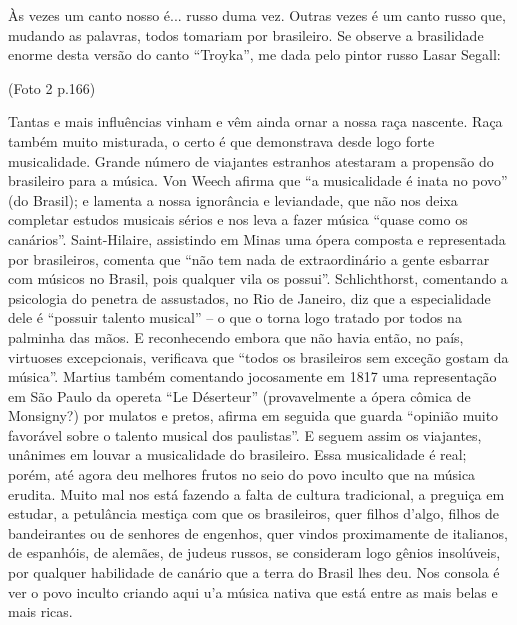 Às vezes um canto nosso é... russo duma vez. Outras vezes é um canto
russo que, mudando as palavras, todos tomariam por brasileiro. Se
observe a brasilidade enorme desta versão do canto ``Troyka'', me dada
pelo pintor russo Lasar Segall:

(Foto 2 p.166)

Tantas e mais influências vinham e vêm ainda ornar a nossa raça
nascente. Raça também muito misturada, o certo é que demonstrava desde
logo forte musicalidade. Grande número de viajantes estranhos atestaram
a propensão do brasileiro para a música. Von Weech afirma que ``a
musicalidade é inata no povo'' (do Brasil); e lamenta a nossa ignorância
e leviandade, que não nos deixa completar estudos musicais sérios e nos
leva a fazer música ``quase como os canários''. Saint-Hilaire,
assistindo em Minas uma ópera composta e representada por brasileiros,
comenta que ``não tem nada de extraordinário a gente esbarrar com
músicos no Brasil, pois qualquer vila os possui''. Schlichthorst,
comentando a psicologia do penetra de assustados, no Rio de Janeiro, diz
que a especialidade dele é ``possuir talento musical'' -- o que o torna
logo tratado por todos na palminha das mãos. E reconhecendo embora que
não havia então, no país, virtuoses excepcionais, verificava que ``todos
os brasileiros sem exceção gostam da música''. Martius também comentando
jocosamente em 1817 uma representação em São Paulo da opereta ``Le
Déserteur'' (provavelmente a ópera cômica de Monsigny?) por mulatos e
pretos, afirma em seguida que guarda ``opinião muito favorável sobre o
talento musical dos paulistas''. E seguem assim os viajantes, unânimes
em louvar a musicalidade do brasileiro. Essa musicalidade é real; porém,
até agora deu melhores frutos no seio do povo inculto que na música
erudita. Muito mal nos está fazendo a falta de cultura tradicional, a
preguiça em estudar, a petulância mestiça com que os brasileiros, quer
filhos d'algo, filhos de bandeirantes ou de senhores de engenhos, quer
vindos proximamente de italianos, de espanhóis, de alemães, de judeus
russos, se consideram logo gênios insolúveis, por qualquer habilidade de
canário que a terra do Brasil lhes deu. Nos consola é ver o povo inculto
criando aqui u'a música nativa que está entre as mais belas e mais
ricas.

